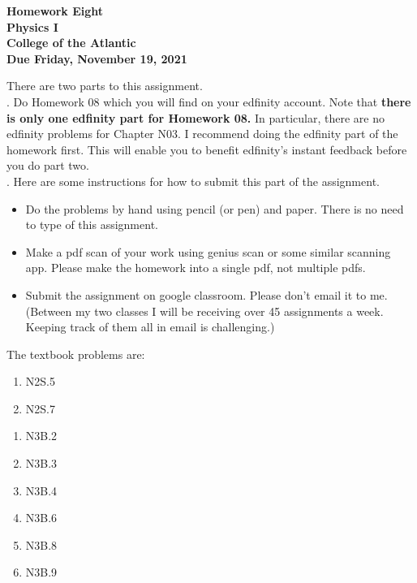 \documentclass[12pt]{article}
\begin{document}
\pagestyle{empty}
 
\begin{center}
{\LARGE {\bf Homework Eight}}\\
\bigskip
{\Large {\bf Physics I}}\\
\bigskip
{\Large {\bf College of the Atlantic}}\\
\bigskip
{ {\bf Due Friday, November 19, 2021}}\\ 
\end{center}
\medskip

\noindent There are two parts to this assignment.\\


.  Do Homework 08 which you will find
on your edfinity account.  Note that {\bf there is only one edfinity
  part for Homework 08.}  In particular, there are no edfinity
problems for Chapter N03.  I recommend doing the edfinity part of the
homework first.  This will enable you to benefit edfinity's instant
feedback before you do part two.\\  


.  Here are some
instructions for how to submit this part of the assignment.
\begin{itemize}
\item Do the problems by hand using pencil (or pen) and paper.
  There is no need to type of this assignment.
\item Make a pdf scan of your work using genius scan or some
  similar scanning app.  Please make the homework into a single
  pdf, not multiple pdfs.
\item Submit the assignment on google classroom.  Please don't
  email it to me.  (Between my two classes I will be receiving
  over 45 assignments a week.  Keeping track of them all in email
  is challenging.)\\
\end{itemize}

\noindent The textbook problems are:\\   
 
\begin{enumerate}
  \setlength{\itemsep}{0mm}
\item N2S.5
\item N2S.7\\
\end{enumerate}

\begin{enumerate}
  \setlength{\itemsep}{0mm}
\item N3B.2
\item N3B.3
\item N3B.4
\item N3B.6
  \item N3B.8
  \item N3B.9\\
  \end{enumerate}
\end{document}
